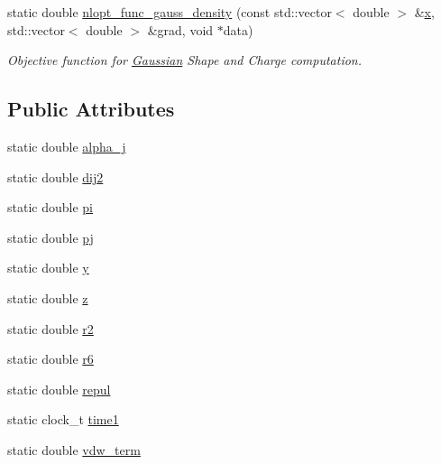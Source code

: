 \begin{DoxyCompactItemize}
static double \hyperlink{classMinimizer2_a1e0732ccaf045c27bb2cc3186fddff55}{nlopt\_\-func\_\-gauss\_\-density} (const std::vector$<$ double $>$ \&\hyperlink{classMinimizer2_ad34cff3ae59c83548e2d5485e800897e}{x}, std::vector$<$ double $>$ \&grad, void $\ast$data)
\begin{DoxyCompactList}\small\item\em Objective function for \hyperlink{classGaussian}{Gaussian} Shape and Charge computation. \end{DoxyCompactList}\end{DoxyCompactItemize}
\subsection*{Public Attributes}
\begin{DoxyCompactItemize}
\item 
static double \hyperlink{classMinimizer2_a5907490bde60e76d02217390e32a66eb}{alpha\_\-j}
\item 
static double \hyperlink{classMinimizer2_a94cdc4b856be09a22683920582c2fe82}{dij2}
\item 
static double \hyperlink{classMinimizer2_a4ec6faa72ef628c5fb9c860f79e22581}{pi}
\item 
static double \hyperlink{classMinimizer2_a2a464eda6d14d97c76ad19d9d713a143}{pj}
\item 
static double \hyperlink{classMinimizer2_a894a781f062079e7fb78ec9ee176f197}{y}
\item 
static double \hyperlink{classMinimizer2_a67af59755e277209aff3e4137364be63}{z}
\item 
static double \hyperlink{classMinimizer2_ac39a59aea04d00554b1c55d2d6341897}{r2}
\item 
static double \hyperlink{classMinimizer2_a6eb98a0ee8462eb25479560885798552}{r6}
\item 
static double \hyperlink{classMinimizer2_aed61b49820c062adf7cd7dd5b4a27555}{repul}
\item 
static clock\_\-t \hyperlink{classMinimizer2_abb0118980a0aa4c6717ff9dc88668f45}{time1}
\item 
static double \hyperlink{classMinimizer2_a056a439a64220298d298cd7e2bd59339}{vdw\_\-term}
\end{DoxyCompactItemize}
